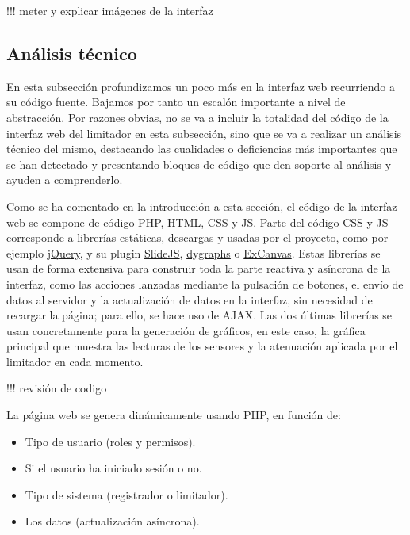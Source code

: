 !!! meter y explicar imágenes de la interfaz

\subsection{Análisis técnico}

En esta subsección profundizamos un poco más en la interfaz web recurriendo a su código fuente. Bajamos por tanto un escalón importante a nivel de abstracción. Por razones obvias, no se va a incluir la totalidad del código de la interfaz web del limitador en esta subsección, sino que se va a realizar un análisis técnico del mismo, destacando las cualidades o deficiencias más importantes que se han detectado y presentando bloques de código que den soporte al análisis y ayuden a comprenderlo.


Como se ha comentado en la introducción a esta sección, el código de la interfaz web se compone de código PHP, HTML, CSS y JS. Parte del código CSS y JS corresponde a librerías estáticas, descargas y usadas por el proyecto, como por ejemplo \href{https://jquery.com/}{jQuery}, y su plugin \href{https://nathansearles.github.io/slidesjs/}{SlideJS}, \href{https://dygraphs.com/}{dygraphs} o \href{https://github.com/arv/explorercanvas}{ExCanvas}. Estas librerías se usan de forma extensiva para construir toda la parte reactiva y asíncrona de la interfaz, como las acciones lanzadas mediante la pulsación de botones, el envío de datos al servidor y la actualización de datos en la interfaz, sin necesidad de recargar la página; para ello, se hace uso de AJAX. Las dos últimas librerías se usan concretamente para la generación de gráficos, en este caso, la gráfica principal que muestra las lecturas de los sensores y la atenuación aplicada por el limitador en cada momento.

!!! revisión de codigo

La página web se genera dinámicamente usando PHP, en función de:

\begin{itemize}
    \item Tipo de usuario (roles y permisos).
    \item Si el usuario ha iniciado sesión o no.
    \item Tipo de sistema (registrador o limitador).
    \item Los datos (actualización asíncrona).
\end{itemize}

